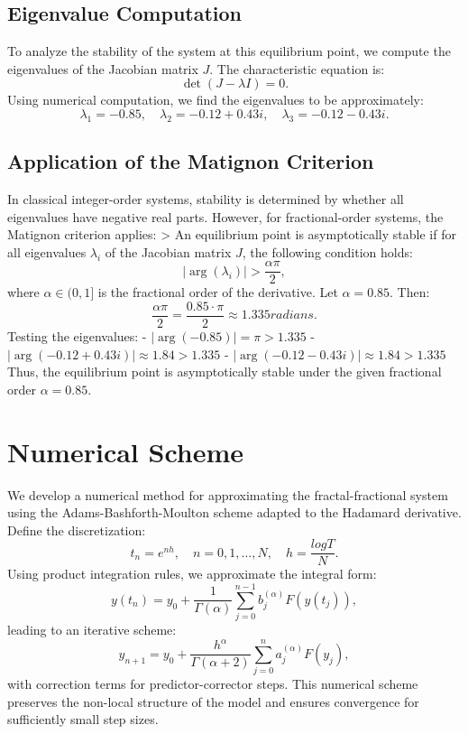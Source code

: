 \documentclass[10pt]{NSP1}
\begin{document}
\subsection{Eigenvalue Computation}
To analyze the stability of the system at this equilibrium point, we compute the eigenvalues of the Jacobian matrix \(J\). The characteristic equation is:
\[\det(J - \lambda I) = 0.\]
Using numerical computation, we find the eigenvalues to be approximately:
\[\lambda_{1} = - 0.85,\quad\lambda_{2} = - 0.12 + 0.43i,\quad\lambda_{3} = - 0.12 - 0.43i.\]
\subsection{Application of the Matignon Criterion}
In classical integer-order systems, stability is determined by whether all eigenvalues have negative real parts. However, for fractional-order systems, the Matignon criterion applies: \textgreater{} An equilibrium point is asymptotically stable if for all eigenvalues \(\lambda_{i}\) of the Jacobian matrix \(J\), the following condition holds:
\[\left| \arg\left( \lambda_{i} \right) \right| > \frac{\alpha\pi}{2},\]
where \(\alpha \in (0,1\rbrack\) is the fractional order of the derivative.
Let \(\alpha = 0.85\). Then:
\[\frac{\alpha\pi}{2} = \frac{0.85 \cdot \pi}{2} \approx 1.335radians.\]
Testing the eigenvalues: - \(\left| \arg( - 0.85) \right| = \pi > 1.335\) - \(\left| \arg( - 0.12 + 0.43i) \right| \approx 1.84 > 1.335\) - \(\left| \arg( - 0.12 - 0.43i) \right| \approx 1.84 > 1.335\) Thus, the equilibrium point is asymptotically stable under the given fractional order \(\alpha = 0.85\).
\section{Numerical Scheme}
We develop a numerical method for approximating the fractal-fractional system using the Adams-Bashforth-Moulton scheme adapted to the Hadamard derivative.
Define the discretization:
\[t_{n} = e^{nh},\quad n = 0,1,...,N,\quad h = \frac{logT}{N}.\]
Using product integration rules, we approximate the integral form:
\[y\left( t_{n} \right) = y_{0} + \frac{1}{\Gamma(\alpha)}\sum_{j = 0}^{n - 1}{}b_{j}^{(\alpha)}F\left( y\left( t_{j} \right) \right),\]
leading to an iterative scheme:
\[y_{n + 1} = y_{0} + \frac{h^{\alpha}}{\Gamma(\alpha + 2)}\sum_{j = 0}^{n}{}a_{j}^{(\alpha)}F\left( y_{j} \right),\]
with correction terms for predictor-corrector steps.
This numerical scheme preserves the non-local structure of the model and ensures convergence for sufficiently small step sizes.
\end{document}
